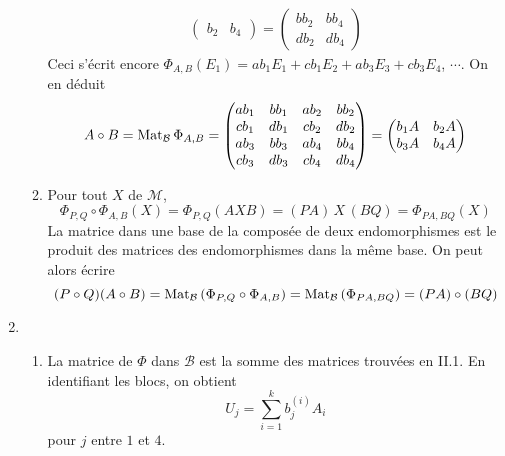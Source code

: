\begin{enumerate}
\begin{enumerate}
\begin{align*}
\begin{pmatrix}
b_{2} & b_{4}
\end{pmatrix}
 = 
\begin{pmatrix}
bb_{2} & bb_{4} \\ 
db_{2} & db_{4}
\end{pmatrix} 
\end{align*}
Ceci s'\'{e}crit encore $\Phi_{A,B}(E_{1})=ab_{1}E_{1}+cb_{1}E_{2}+ab_{3}E_{3}+cb_{3}E_{4}$, $\cdots$. On en d\'{e}duit 
\[
A\circ B= \operatorname{Mat}_{\mathcal{B}}\Phi_{A,B} =
\begin{pmatrix}
ab_{1} & bb_{1} & ab_{2} & bb_{2} \\ 
cb_{1} & db_{1} & cb_{2} & db_{2} \\ 
ab_{3} & bb_{3} & ab_{4} & bb_{4} \\ 
cb_{3} & db_{3} & cb_{4} & db_{4}
\end{pmatrix}
 =
\begin{pmatrix}
b_{1}A & b_{2}A \\ 
b_{3}A & b_{4}A
\end{pmatrix}
\]

\item Pour tout $X$ de $\mathcal{M}$, 
\begin{displaymath}
\Phi _{P,Q}\circ \Phi_{A,B}(X) = \Phi _{P,Q}(AXB) =(PA)\,X\,(BQ)=\Phi _{PA,BQ}(X) 
\end{displaymath}
La matrice dans une base de la composée de deux endomorphismes est le produit des matrices des endomorphismes dans la même base. On peut alors écrire
\begin{displaymath}
(P\circ Q)(A\circ B)
= \operatorname{Mat}_{\mathcal B}\left( \Phi _{P,Q}\circ \Phi _{A,B}\right) 
=  \operatorname{Mat}_{\mathcal B}\left( \Phi _{PA,BQ}\right)
= (PA)\circ (BQ)
\end{displaymath}
\end{enumerate}

\item 
\begin{enumerate}
 \item  La matrice de $\Phi$ dans $\mathcal{B}$ est la somme des matrices trouvées en II.1. En identifiant les blocs, on obtient
\begin{displaymath}
 U_{j}=\sum_{i=1}^{k}b_{j}^{(i)}A_{i}
\end{displaymath}
pour $j$ entre $1$ et $4$.


\end{enumerate}
\end{enumerate}
